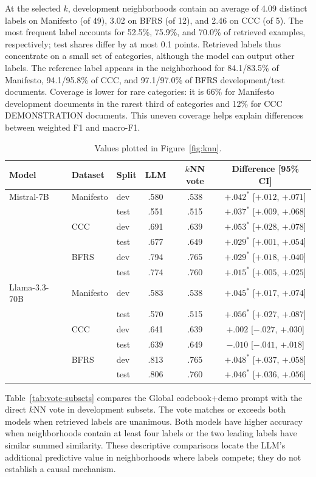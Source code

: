 \documentclass[11pt]{article}
\begin{document}
At the selected $k$, development neighborhoods contain an average of 4.09 distinct labels on Manifesto (of 49), 3.02 on BFRS (of 12), and 2.46 on CCC (of 5). The most frequent label accounts for 52.5\%, 75.9\%, and 70.0\% of retrieved examples, respectively; test shares differ by at most 0.1 points. Retrieved labels thus concentrate on a small set of categories, although the model can output other labels. The reference label appears in the neighborhood for 84.1/83.5\% of Manifesto, 94.1/95.8\% of CCC, and 97.1/97.0\% of BFRS development/test documents. Coverage is lower for rare categories: it is 66\% for Manifesto development documents in the rarest third of categories and 12\% for CCC DEMONSTRATION documents. This uneven coverage helps explain differences between weighted F1 and macro-F1.

\begin{table}[!t]
\centering
\begin{tabular}{lllccc}
\toprule
Model & Dataset & Split & LLM & $k$NN vote & Difference [95\% CI] \\
\midrule
Mistral-7B & Manifesto & dev & .580 & .538 & $+.042^*$ [$+.012$, $+.071$] \\
 &  & test & .551 & .515 & $+.037^*$ [$+.009$, $+.068$] \\
 & CCC & dev & .691 & .639 & $+.053^*$ [$+.028$, $+.078$] \\
 &  & test & .677 & .649 & $+.029^*$ [$+.001$, $+.054$] \\
 & BFRS & dev & .794 & .765 & $+.029^*$ [$+.018$, $+.040$] \\
 &  & test & .774 & .760 & $+.015^*$ [$+.005$, $+.025$] \\
\midrule
Llama-3.3-70B & Manifesto & dev & .583 & .538 & $+.045^*$ [$+.017$, $+.074$] \\
 &  & test & .570 & .515 & $+.056^*$ [$+.027$, $+.087$] \\
 & CCC & dev & .641 & .639 & $+.002$ [$-.027$, $+.030$] \\
 &  & test & .639 & .649 & $-.010$ [$-.041$, $+.018$] \\
 & BFRS & dev & .813 & .765 & $+.048^*$ [$+.037$, $+.058$] \\
 &  & test & .806 & .760 & $+.046^*$ [$+.036$, $+.056$] \\
\bottomrule
\end{tabular}
\caption{Values plotted in Figure~\ref{fig:knn}.}
\label{tab:knn}
\end{table}


Table~\ref{tab:vote-subsets} compares the Global codebook+demo prompt with the direct $k$NN vote in development subsets. The vote matches or exceeds both models when retrieved labels are unanimous. Both models have higher accuracy when neighborhoods contain at least four labels or the two leading labels have similar summed similarity. These descriptive comparisons locate the LLM's additional predictive value in neighborhoods where labels compete; they do not establish a causal mechanism.
\end{document}
